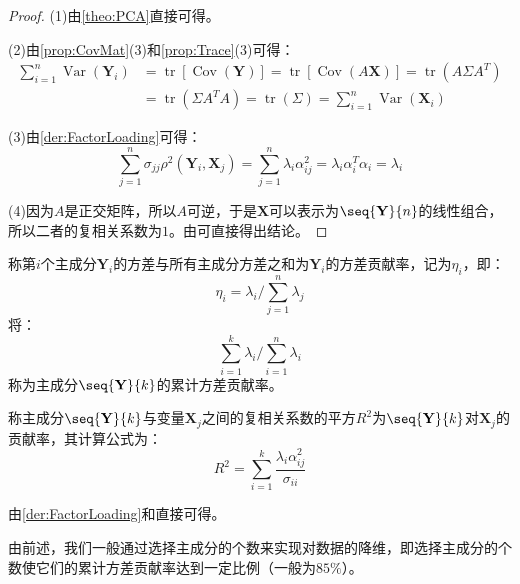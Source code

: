\begin{proof}
	(1)由\cref{theo:PCA}直接可得。\par
	(2)由\cref{prop:CovMat}(3)和\cref{prop:Trace}(3)可得：
	\begin{align*}
		\sum_{i=1}^{n}\operatorname{Var}(\mathbf{Y}_i)
		&=\operatorname{tr}[\operatorname{Cov}(\mathbf{Y})]=\operatorname{tr}[\operatorname{Cov}(A\mathbf{X})]=\operatorname{tr}(A\Sigma A^T) \\
		&=\operatorname{tr}(\Sigma A^TA)=\operatorname{tr}(\Sigma)=\sum_{i=1}^{n}\operatorname{Var}(\mathbf{X}_i)
	\end{align*}\par
	(3)由\cref{der:FactorLoading}可得：
	\begin{equation*}
		\sum_{j=1}^{n}\sigma_{jj}\rho^2(\mathbf{Y}_i,\mathbf{X}_j)=\sum_{j=1}^{n}\lambda_i\alpha_{ij}^2=\lambda_i\alpha_i^T\alpha_i=\lambda_i
	\end{equation*}\par
	(4)因为$A$是正交矩阵，所以$A$可逆，于是$\mathbf{X}$可以表示为$\seq{\mathbf{Y}}{n}$的线性组合，所以二者的复相关系数为$1$。由可直接得出结论。
\end{proof}
\begin{definition}
	称第$i$个主成分$\mathbf{Y}_i$的方差与所有主成分方差之和为$\mathbf{Y}_i$的方差贡献率，记为$\eta_i$，即：
	\begin{equation*}
		\eta_i=\lambda_i\Big/\sum\limits_{j=1}^{n}\lambda_j
	\end{equation*}
	将：
	\begin{equation*}
		\sum\limits_{i=1}^{k}\lambda_i\Big/\sum\limits_{i=1}^{n}\lambda_i
	\end{equation*}
	称为主成分$\seq{\mathbf{Y}}{k}$的累计方差贡献率。
\end{definition}
\begin{definition}
	称主成分$\seq{\mathbf{Y}}{k}$与变量$\mathbf{X}_j$之间的复相关系数的平方$R^2$为$\seq{\mathbf{Y}}{k}$对$\mathbf{X}_j$的贡献率，其计算公式为：
	\begin{equation*}
		R^2=\sum_{i=1}^{k}\frac{\lambda_i\alpha_{ij}^2}{\sigma_{ii}}
	\end{equation*}
\end{definition}
\begin{derivation}
	由\cref{der:FactorLoading}和直接可得。
\end{derivation}
由前述，我们一般通过选择主成分的个数来实现对数据的降维，即选择主成分的个数使它们的累计方差贡献率达到一定比例（一般为$85\%$）。

